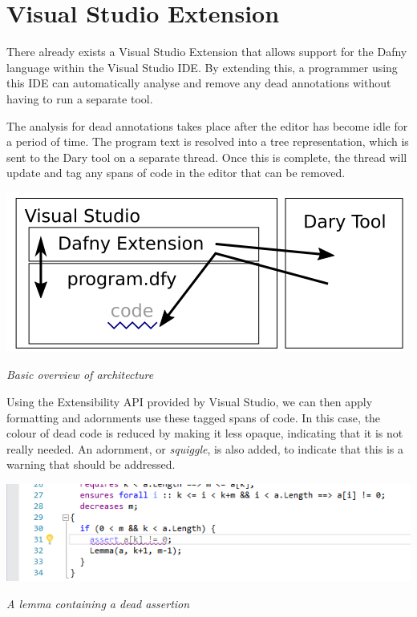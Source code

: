 \documentclass[a4paper]{article}
\begin{document}
\section{Visual Studio Extension}
There already exists a Visual Studio Extension that allows support for the Dafny language within the Visual Studio IDE. By extending this, a programmer using this IDE can automatically analyse and remove any dead annotations without having to run a separate tool.\par
The analysis for dead annotations takes place after the editor has become idle for a period of time. The program text is resolved into a tree representation, which is sent to the Dary tool on a separate thread. Once this is complete, the thread will update and tag any spans of code in the editor that can be removed.\par

\begin{centering}
\vspace{0.5cm}
\includegraphics[scale=0.5]{drawing.png}\par
\textit{Basic overview of architecture}\par
\vspace{0.5cm}
\end{centering}

Using the Extensibility API provided by Visual Studio, we can then apply formatting and adornments use these tagged spans of code. In this case, the colour of dead code is reduced by making it less opaque, indicating that it is not really needed. An adornment, or \textit{squiggle}, is also added, to indicate that this is a warning that should be addressed.\par

\begin{centering}
\vspace{0.5cm}
\includegraphics[scale=0.8]{tagLine2.png}\par
\textit{A lemma containing a dead assertion}\par
\vspace{0.5cm}
\end{centering}
\end{document}
